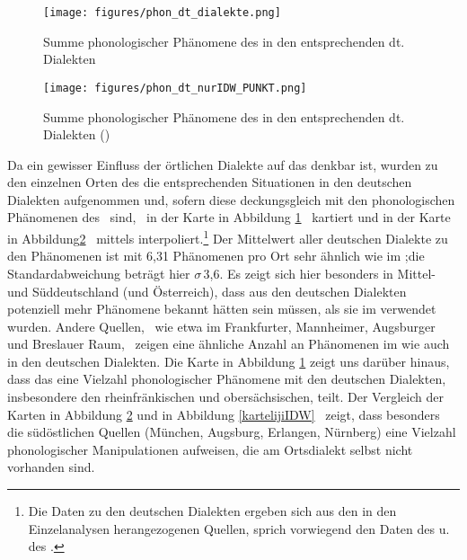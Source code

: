 {\begin{figure}[p]
\texttt{[image: figures/phon\_dt\_dialekte.png]}
		\caption{\label{allphondt} Summe phonologischer Phänomene des  in den entsprechenden dt. Dialekten}
		\end{figure}
		
		
\begin{figure}[p]
		 
\texttt{[image: figures/phon\_dt\_nurIDW\_PUNKT.png]}
		\caption{\label{IDWphondt} Summe phonologischer Phänomene des  in den entsprechenden dt. Dialekten ()}
		\end{figure}

Da ein gewisser Einfluss der örtlichen Dialekte auf das  denkbar ist, wurden zu den einzelnen Orten des  die entsprechenden Situationen in den deutschen Dialekten aufgenommen und, sofern diese deckungsgleich mit den phonologischen Phänomenen des  \,%
sind, \,%
in der Karte in Abbildung \ref{allphondt} \,%
kartiert und in der  Karte in Abbildung\ref{IDWphondt} \,%
 mittels  interpoliert.\footnote{Die Daten zu den deutschen Dialekten ergeben sich aus den in den Einzelanalysen herangezogenen Quellen, sprich vorwiegend den Daten des  u. des .} Der Mittelwert aller deutschen Dialekte zu den Phänomenen ist mit  6,31 Phänomenen pro Ort sehr ähnlich wie im ;die Standardabweichung beträgt hier {$\sigma$}\,3,6. Es zeigt sich hier besonders in Mittel- und Süddeutschland (und Österreich), dass aus den deutschen Dialekten potenziell mehr Phänomene bekannt hätten sein müssen, als sie im  verwendet wurden. Andere Quellen, \,%
 wie etwa im Frankfurter, Mannheimer, Augsburger und Breslauer Raum, \,%
 zeigen eine ähnliche Anzahl an Phänomenen im  wie auch in den deutschen Dialekten. Die Karte in Abbildung  \ref{allphondt} %
 zeigt uns darüber hinaus, dass das \hai{{\LiJieins}} eine Vielzahl phonologischer Phänomene mit den deutschen Dialekten, \,%
 insbesondere den rheinfränkischen und obersächsischen, teilt. Der Vergleich der Karten in Abbildung \ref{IDWphondt} und in Abbildung \ref{kartelijiIDW} \,%
  zeigt, dass besonders die südöstlichen Quellen (München, Augsburg, Erlangen, Nürnberg) eine Vielzahl phonologischer Manipulationen aufweisen, die am Ortsdialekt selbst nicht vorhanden sind.



}
